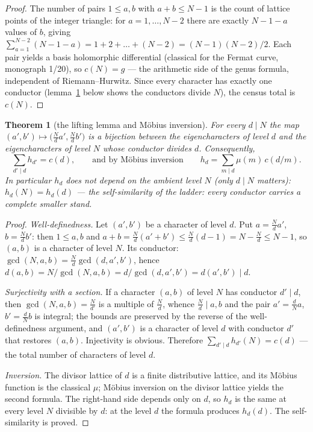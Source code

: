 \documentclass[11pt,a4paper]{article}
\theoremstyle{plain}
\newtheorem{theorem}{Theorem}
\theoremstyle{definition}
\theoremstyle{remark}
\begin{document}
\begin{proof}
The number of pairs $1\le a,b$ with $a+b\le N-1$ is the count of
lattice points of the integer triangle: for $a=1,\dots,N-2$ there
are exactly $N-1-a$ values of $b$, giving
$\sum_{a=1}^{N-2}(N-1-a)=1+2+\dots+(N-2)=(N-1)(N-2)/2$.
Each pair yields a basis holomorphic differential (classical for
the Fermat curve, monograph 1/20), so $c(N)=g$ --- the
arithmetic side of the genus formula, independent of
Riemann--Hurwitz. Since every character has exactly one conductor
(lemma~\ref{th:lift} below shows the conductors divide $N$), the
census total is $c(N)$.
\end{proof}

\begin{theorem}[the lifting lemma and M\"obius inversion]\label{th:lift}
For every $d\mid N$ the map
$(a',b')\mapsto\big(\tfrac{N}{d}a',\tfrac{N}{d}b'\big)$ is a
bijection between the eigencharacters of level $d$ and the
eigencharacters of level $N$ whose conductor divides $d$.
Consequently,
\[
  \sum_{d'\mid d}h_{d'}=c(d),
  \qquad\text{and by M\"obius inversion}\qquad
  h_d=\sum_{m\mid d}\mu(m)\,c(d/m).
\]
In particular $h_d$ does not depend on the ambient level $N$
(only $d\mid N$ matters): $h_d(N)=h_d(d)$ --- \emph{the
self-similarity of the ladder}: every conductor carries a
complete smaller stand.
\end{theorem}

\begin{proof}
\emph{Well-definedness.} Let $(a',b')$ be a character of level
$d$. Put $a=\tfrac{N}{d}a'$, $b=\tfrac{N}{d}b'$: then
$1\le a,b$ and $a+b=\tfrac{N}{d}(a'+b')\le\tfrac{N}{d}(d-1)
=N-\tfrac{N}{d}\le N-1$, so $(a,b)$ is a character of level $N$.
Its conductor: $\gcd(N,a,b)=\tfrac{N}{d}\gcd(d,a',b')$, hence
$d(a,b)=N/\gcd(N,a,b)=d/\gcd(d,a',b')=d(a',b')\mid d$.

\emph{Surjectivity with a section.} If a character $(a,b)$ of
level $N$ has conductor $d'\mid d$, then
$\gcd(N,a,b)=\tfrac{N}{d'}$ is a multiple of $\tfrac{N}{d}$,
whence $\tfrac{N}{d}\mid a,b$ and the pair $a'=\tfrac{d}{N}a$,
$b'=\tfrac{d}{N}b$ is integral; the bounds are preserved by the
reverse of the well-definedness argument, and $(a',b')$ is a
character of level $d$ with conductor $d'$ that restores $(a,b)$.
Injectivity is obvious. Therefore
$\sum_{d'\mid d}h_{d'}(N)=c(d)$ --- the total number of
characters of level $d$.

\emph{Inversion.} The divisor lattice of $d$ is a finite
distributive lattice, and its M\"obius function is the classical
$\mu$; M\"obius inversion on the divisor lattice yields the
second formula. The right-hand side depends only on $d$, so $h_d$
is the same at every level $N$ divisible by $d$: at the level $d$
the formula produces $h_d(d)$. The self-similarity is proved.
\end{proof}
\end{document}

